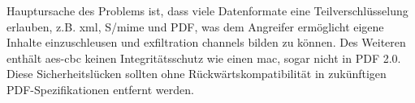 Hauptursache des Problems ist, dass viele Datenformate eine Teilverschlüsselung erlauben, z.B. \gls{xml}, S/\gls{mime} und PDF, was dem Angreifer ermöglicht eigene Inhalte einzuschleusen und exfiltration channels bilden zu können. Des Weiteren enthält \gls{aes}-\gls{cbc} keinen Integritätsschutz wie einen \gls{mac}, sogar nicht in PDF 2.0. Diese Sicherheitslücken sollten ohne Rückwärtskompatibilität in zukünftigen PDF-Spezifikationen entfernt werden. \cite{pdfex}
